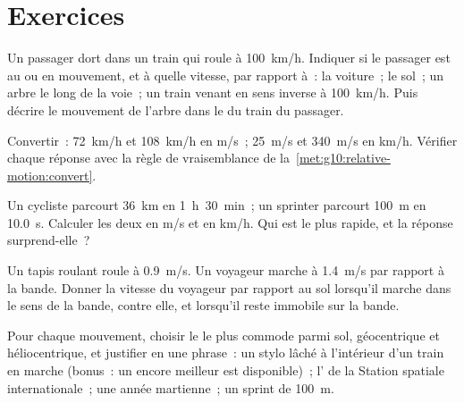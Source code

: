 \section{Exercices}

\begin{exercise}[$\star$]\label{exo:g10:relative-motion:1}
Un passager dort dans un train qui roule à \qty{100}{km/h}. Indiquer
si le passager est au  ou en mouvement, et à quelle
vitesse, par rapport à~: la voiture~; le sol~; un arbre le long de la
voie~; un train venant en sens inverse à \qty{100}{km/h}. Puis
décrire le mouvement de l'arbre dans le  du train du
passager.
\end{exercise}

\begin{exercise}[$\star$]\label{exo:g10:relative-motion:2}
Convertir~: \qty{72}{km/h} et \qty{108}{km/h} en \unit{m/s}~;
\qty{25}{m/s} et \qty{340}{m/s} en \unit{km/h}. Vérifier chaque
réponse avec la règle de vraisemblance de
la~\cref{met:g10:relative-motion:convert}.
\end{exercise}

\begin{exercise}[$\star$]\label{exo:g10:relative-motion:3}
Un cycliste parcourt \qty{36}{km} en \qty{1}{h}~\qty{30}{min}~; un
sprinter parcourt \qty{100}{m} en \qty{10.0}{s}. Calculer les deux
 en \unit{m/s} et en \unit{km/h}. Qui est le
plus rapide, et la réponse surprend-elle~?
\end{exercise}

\begin{exercise}[$\star$]\label{exo:g10:relative-motion:4}
Un tapis roulant roule à \qty{0.9}{m/s}. Un voyageur marche à
\qty{1.4}{m/s} par rapport à la bande. Donner la vitesse du voyageur
par rapport au sol lorsqu'il marche dans le sens de la bande, contre
elle, et lorsqu'il reste immobile sur la bande.
\end{exercise}

\begin{exercise}[$\star$]\label{exo:g10:relative-motion:5}
Pour chaque mouvement, choisir le  le plus commode parmi
sol, géocentrique et héliocentrique, et justifier en une phrase~: un
stylo lâché à l'intérieur d'un train en marche (bonus~: un 
encore meilleur est disponible)~; l' de la Station
spatiale internationale~; une année martienne~; un sprint de
\qty{100}{m}.
\end{exercise}

